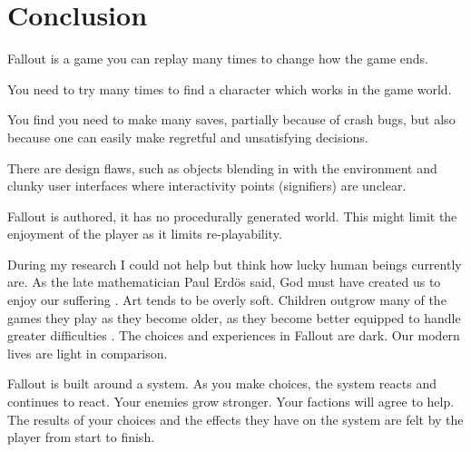 
\section{Conclusion}

Fallout is a game you can replay many times to change how the game ends.

You need to try many times to find a character which works in the game world.

You find you need to make many saves, partially because of crash bugs, but also because one can easily make regretful and unsatisfying decisions.

There are design flaws, such as objects blending in with the environment and clunky user interfaces where interactivity points (signifiers) are unclear.

Fallout is authored, it has no procedurally generated world. This might limit the enjoyment of the player as it limits re-playability.

During my research I could not help but think how lucky human beings currently are. As the late mathematician Paul Erdös said, God must have created us to enjoy our suffering \autocite[4]{hoffman_man_1998}. Art tends to be overly soft. Children outgrow many of the games they play as they become older, as they become better equipped to handle greater difficulties \autocite[99]{hiwiller_players_2016}. The choices and experiences in Fallout are dark. Our modern lives are light in comparison.

Fallout is built around a system. As you make choices, the system reacts and continues to react. Your enemies grow stronger. Your factions will agree to help. The results of your choices and the effects they have on the system are felt by the player from start to finish.
